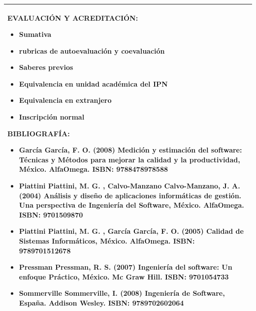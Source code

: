 \documentclass[10pt]{article}
\begin{document}
\begin{longtable}{|p{}|}
    \textbf{EVALUACIÓN Y ACREDITACIÓN:}
    \begin{itemize}[leftmargin=*]
    \setlength{\itemsep}{0pt}
    \setlength{\parskip}{0pt}
    \item Sumativa\item rubricas de autoevaluación y coevaluación\item Saberes previos\item Equivalencia en unidad académica del IPN\item Equivalencia en extranjero\item Inscripción normal
    \end{itemize}
    \textbf{BIBLIOGRAFÍA:}
    \begin{itemize}[leftmargin=*]
    \setlength{\itemsep}{0pt}
    \setlength{\parskip}{0pt}
    \item García García, F. O. (2008) Medición y estimación del software: Técnicas y Métodos para mejorar la calidad y la productividad, México. AlfaOmega. ISBN: 9788478978588\item Piattini Piattini, M. G. , Calvo-Manzano Calvo-Manzano, J. A. (2004) Análisis y diseño de aplicaciones informáticas de gestión. Una perspectiva de Ingeniería del Software, México. AlfaOmega. ISBN: 9701509870\item Piattini Piattini, M. G. , García García, F. O. (2005) Calidad de Sistemas Informáticos, México. AlfaOmega. ISBN: 9789701512678\item Pressman Pressman, R. S. (2007) Ingeniería del software: Un enfoque Práctico, México. Mc Graw Hill. ISBN: 9701054733\item Sommerville Sommerville, I. (2008) Ingeniería de Software, España. Addison Wesley. ISBN: 9789702602064 
    \end{itemize}
    \\ \hline
  \end{longtable}

\end{document}
